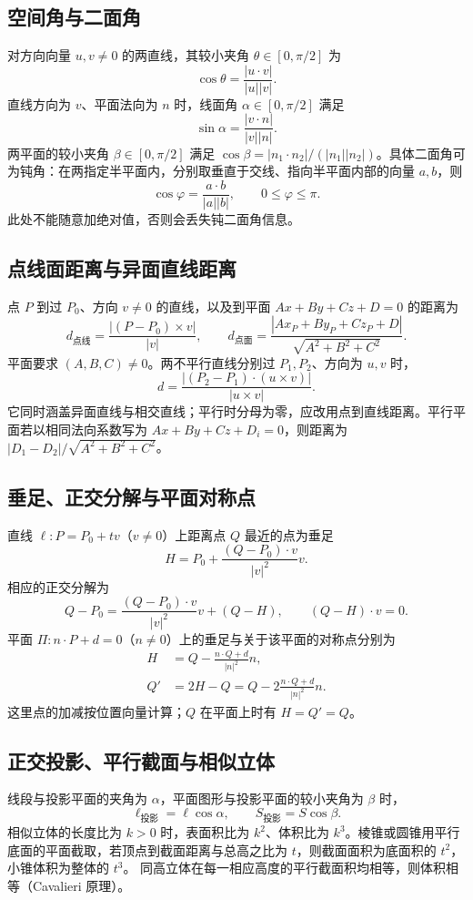 \documentclass[../main.tex]{subfiles}
\begin{document}
\subsection{空间角与二面角}
对方向向量 $u,v\ne0$ 的两直线，其较小夹角 $\theta\in[0,\pi/2]$ 为
\[
\cos\theta=\frac{|u\cdot v|}{|u||v|}.
\]
直线方向为 $v$、平面法向为 $n$ 时，线面角 $\alpha\in[0,\pi/2]$ 满足
\[
\sin\alpha=\frac{|v\cdot n|}{|v||n|}.
\]
两平面的较小夹角 $\beta\in[0,\pi/2]$ 满足 $\cos\beta=|n_1\cdot n_2|/(|n_1||n_2|)$。具体二面角可为钝角：在两指定半平面内，分别取垂直于交线、指向半平面内部的向量 $a,b$，则
\[
\cos\varphi=\frac{a\cdot b}{|a||b|},\qquad0\le\varphi\le\pi.
\]
此处不能随意加绝对值，否则会丢失钝二面角信息。
\subsection{点线面距离与异面直线距离}
点 $P$ 到过 $P_0$、方向 $v\ne0$ 的直线，以及到平面 $Ax+By+Cz+D=0$ 的距离为
\[
d_{\text{点线}}=\frac{|(P-P_0)\times v|}{|v|},\qquad
d_{\text{点面}}=\frac{|Ax_P+By_P+Cz_P+D|}{\sqrt{A^2+B^2+C^2}}.
\]
平面要求 $(A,B,C)\ne0$。两不平行直线分别过 $P_1,P_2$、方向为 $u,v$ 时，
\[
d=\frac{|(P_2-P_1)\cdot(u\times v)|}{|u\times v|}.
\]
它同时涵盖异面直线与相交直线；平行时分母为零，应改用点到直线距离。平行平面若以相同法向系数写为 $Ax+By+Cz+D_i=0$，则距离为 $|D_1-D_2|/\sqrt{A^2+B^2+C^2}$。
\subsection{垂足、正交分解与平面对称点}
直线 $\ell:P=P_0+tv$（$v\ne0$）上距离点 $Q$ 最近的点为垂足
\[
H=P_0+\frac{(Q-P_0)\cdot v}{|v|^2}v.
\]
相应的正交分解为
\[
Q-P_0=\frac{(Q-P_0)\cdot v}{|v|^2}v+(Q-H),\qquad
(Q-H)\cdot v=0.
\]
平面 $\Pi:n\cdot P+d=0$（$n\ne0$）上的垂足与关于该平面的对称点分别为
\begin{align*}
H&=Q-\frac{n\cdot Q+d}{|n|^2}n,\\
Q'&=2H-Q=Q-2\frac{n\cdot Q+d}{|n|^2}n.
\end{align*}
这里点的加减按位置向量计算；$Q$ 在平面上时有 $H=Q'=Q$。
\subsection{正交投影、平行截面与相似立体}
线段与投影平面的夹角为 $\alpha$，平面图形与投影平面的较小夹角为 $\beta$ 时，
\[
\ell_{\text{投影}}=\ell\cos\alpha,\qquad
S_{\text{投影}}=S\cos\beta.
\]
相似立体的长度比为 $k>0$ 时，表面积比为 $k^2$、体积比为 $k^3$。棱锥或圆锥用平行底面的平面截取，若顶点到截面距离与总高之比为 $t$，则截面面积为底面积的 $t^2$，小锥体积为整体的 $t^3$。
同高立体在每一相应高度的平行截面积均相等，则体积相等（Cavalieri 原理）。
\end{document}
